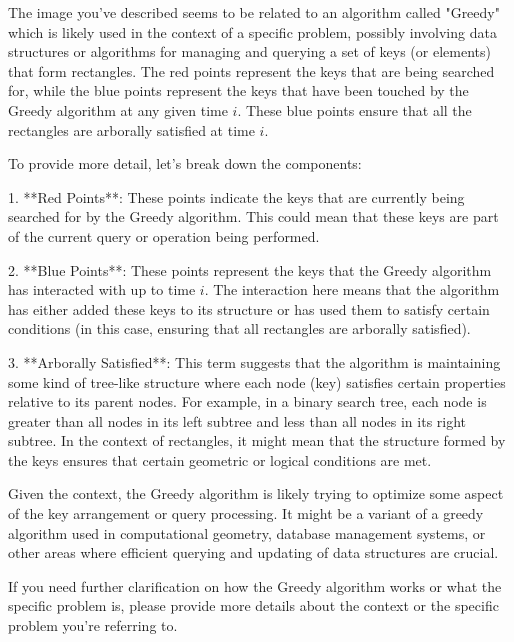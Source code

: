 The image you've described seems to be related to an algorithm called "Greedy" which is likely used in the context of a specific problem, possibly involving data structures or algorithms for managing and querying a set of keys (or elements) that form rectangles. The red points represent the keys that are being searched for, while the blue points represent the keys that have been touched by the Greedy algorithm at any given time \( i \). These blue points ensure that all the rectangles are arborally satisfied at time \( i \).

To provide more detail, let's break down the components:

1. **Red Points**: These points indicate the keys that are currently being searched for by the Greedy algorithm. This could mean that these keys are part of the current query or operation being performed.

2. **Blue Points**: These points represent the keys that the Greedy algorithm has interacted with up to time \( i \). The interaction here means that the algorithm has either added these keys to its structure or has used them to satisfy certain conditions (in this case, ensuring that all rectangles are arborally satisfied).

3. **Arborally Satisfied**: This term suggests that the algorithm is maintaining some kind of tree-like structure where each node (key) satisfies certain properties relative to its parent nodes. For example, in a binary search tree, each node is greater than all nodes in its left subtree and less than all nodes in its right subtree. In the context of rectangles, it might mean that the structure formed by the keys ensures that certain geometric or logical conditions are met.

Given the context, the Greedy algorithm is likely trying to optimize some aspect of the key arrangement or query processing. It might be a variant of a greedy algorithm used in computational geometry, database management systems, or other areas where efficient querying and updating of data structures are crucial.

If you need further clarification on how the Greedy algorithm works or what the specific problem is, please provide more details about the context or the specific problem you're referring to.